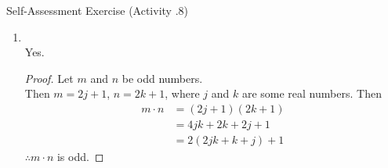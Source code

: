 \documentclass[../notes.tex]{subfiles}
\begin{document}
\begin{exercise}{Self-Assessment Exercise (Activity \thechapter.8)}
\begin{enumerate}
					Yes.
					\begin{proof}
						Let $m$ and $n$ be even numbers.\\
						Then $m = 2j$, $n = 2k$, where $j$ and $k$ are some real numbers.\\
						Then
						\begin{align*}
							m + n &= 2j + 2k\\
							&= 2(j + k)
						\end{align*}
						As the sum of the two numbers is a multiple of $2$, $m + n$ is even.
					\end{proof}
					\pagebreak
					\item {}\\
					Yes.
					\begin{proof}
						Let $m$ and $n$ be odd numbers.\\
						Then $m = 2j + 1$, $n = 2k + 1$, where $j$ and $k$ are some real numbers.
						Then
						\begin{align*}
							m\cdot n &= (2j + 1)(2k + 1)\\
							&= 4jk + 2k + 2j + 1\\
							&= 2(2jk + k + j) + 1
						\end{align*}
						$\therefore m \cdot n$ is odd. 
					\end{proof}
				\end{enumerate}
			\end{exercise}
\end{document}
